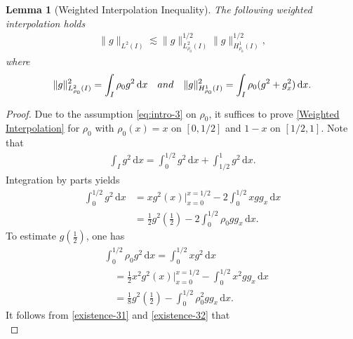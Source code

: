\documentclass[11pt, reqno]{amsart}
\newcommand{\diff}{\mathrm{d}}
\newtheorem{lemma}{Lemma}
\numberwithin{equation}{section}
\begin{document}
{\begin{lemma}[Weighted Interpolation Inequality]\label{le:Preliminary-5} The following weighted interpolation holds
	\begin{align}\label{Weighted Interpolation}
		\|g\|_{L^2(I)}\lesssim \|g\|_{L_{\rho_0}^2(I)}^{1/2}\|g\|_{H_{\rho_0}^1(I)}^{1/2},
	\end{align}
	where
	\begin{equation*}
		\begin{aligned}
			\|g\|_{L_{\rho_0}^2(I)}^2=\int_I\rho_0g^2\,\diff x\quad {\rm{and}}\quad 	\|g\|_{H_{\rho_0}^1(I)}^2=\int_I\rho_0(g^2+g_x^2)\,\diff x.
		\end{aligned}
	\end{equation*}	
\end{lemma}

\begin{proof} Due to the assumption \eqref{eq:intro-3} on \(\rho_0\), it suffices to prove \eqref{Weighted Interpolation}  for \(\rho_0\) with \(\rho_0(x)=x\) on \([0,1/2]\) and \(1-x\) on \([1/2,1]\). Note that
	\begin{equation*}
		\begin{aligned}
			\int_Ig^2\,\diff x= \int_0^{1/2}g^2\,\diff x+\int_{1/2}^1g^2\,\diff x.
		\end{aligned}
	\end{equation*}	
	Integration by parts yields 
	\begin{equation}\label{existence-31}
		\begin{aligned}
			\int_0^{1/2}g^2\,\diff x&=xg^2(x)\big|_{x=0}^{x=1/2}-2\int_0^{1/2}xgg_x\,\diff x\\
			&=\frac{1}{2}g^2(\frac{1}{2})-2\int_0^{1/2}\rho_0gg_x\,\diff x.
		\end{aligned}
	\end{equation}
To estimate \(g(\frac{1}{2})\), one has
	\begin{equation}\label{existence-32}
		\begin{aligned}
			&\int_0^{1/2}\rho_0g^2\,\diff x=\int_0^{1/2}xg^2\,\diff x\\
			&\quad=\frac{1}{2}x^2g^2(x)\big|_{x=0}^{x=1/2}-\int_0^{1/2}x^2gg_x\,\diff x\\
			&\quad=\frac{1}{8}g^2(\frac{1}{2})-\int_0^{1/2}\rho_0^2gg_x\,\diff x.
		\end{aligned}
	\end{equation}
It follows from \eqref{existence-31} and \eqref{existence-32} that
	\begin{equation}\label{existence-33}

\end{equation}
\end{proof}}
\end{document}
